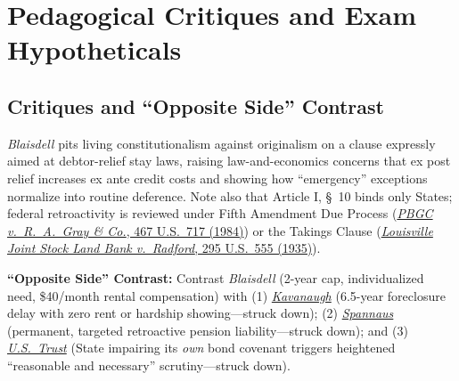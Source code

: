 \documentclass[12pt]{article}
\begin{document}
\section{Pedagogical Critiques and Exam Hypotheticals}

\subsection{Critiques and ``Opposite Side'' Contrast}
\emph{Blaisdell} pits living constitutionalism against originalism on a clause expressly aimed at debtor-relief stay laws, raising law-and-economics concerns that ex post relief increases ex ante credit costs and showing how ``emergency'' exceptions normalize into routine deference. Note also that Article I, \S\ 10 binds only States; federal retroactivity is reviewed under Fifth Amendment Due Process (\href{https://supreme.justia.com/cases/federal/us/467/717/}{\emph{PBGC v.\ R.\ A.\ Gray \& Co.}, 467 U.S.\ 717 (1984)}) or the Takings Clause (\href{https://supreme.justia.com/cases/federal/us/295/555/}{\emph{Louisville Joint Stock Land Bank v.\ Radford}, 295 U.S.\ 555 (1935)}).

\textbf{``Opposite Side'' Contrast:} Contrast \emph{Blaisdell} (2-year cap, individualized need, \$40/month rental compensation) with (1) \href{https://supreme.justia.com/cases/federal/us/295/56/}{\emph{Kavanaugh}} (6.5-year foreclosure delay with zero rent or hardship showing---struck down); (2) \href{https://supreme.justia.com/cases/federal/us/438/234/}{\emph{Spannaus}} (permanent, targeted retroactive pension liability---struck down); and (3) \href{https://supreme.justia.com/cases/federal/us/431/1/}{\emph{U.S.\ Trust}} (State impairing its \emph{own} bond covenant triggers heightened ``reasonable and necessary'' scrutiny---struck down).
\end{document}
